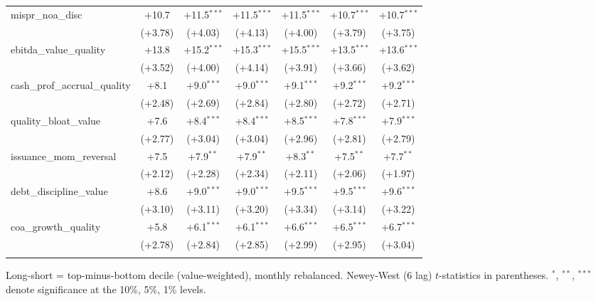 \begin{table}[htbp]
\begin{threeparttable}
\begin{tabular}{lcccccc}
\addlinespace
mispr\_noa\_disc & +10.7 & +11.5$^{***}$ & +11.5$^{***}$ & +11.5$^{***}$ & +10.7$^{***}$ & +10.7$^{***}$ \\
 & (+3.78) & (+4.03) & (+4.13) & (+4.00) & (+3.79) & (+3.75) \\
\addlinespace
ebitda\_value\_quality & +13.8 & +15.2$^{***}$ & +15.3$^{***}$ & +15.5$^{***}$ & +13.5$^{***}$ & +13.6$^{***}$ \\
 & (+3.52) & (+4.00) & (+4.14) & (+3.91) & (+3.66) & (+3.62) \\
\addlinespace
cash\_prof\_accrual\_quality & +8.1 & +9.0$^{***}$ & +9.0$^{***}$ & +9.1$^{***}$ & +9.2$^{***}$ & +9.2$^{***}$ \\
 & (+2.48) & (+2.69) & (+2.84) & (+2.80) & (+2.72) & (+2.71) \\
\addlinespace
quality\_bloat\_value & +7.6 & +8.4$^{***}$ & +8.4$^{***}$ & +8.5$^{***}$ & +7.8$^{***}$ & +7.9$^{***}$ \\
 & (+2.77) & (+3.04) & (+3.04) & (+2.96) & (+2.81) & (+2.79) \\
\addlinespace
issuance\_mom\_reversal & +7.5 & +7.9$^{**}$ & +7.9$^{**}$ & +8.3$^{**}$ & +7.5$^{**}$ & +7.7$^{**}$ \\
 & (+2.12) & (+2.28) & (+2.34) & (+2.11) & (+2.06) & (+1.97) \\
\addlinespace
debt\_discipline\_value & +8.6 & +9.0$^{***}$ & +9.0$^{***}$ & +9.5$^{***}$ & +9.5$^{***}$ & +9.6$^{***}$ \\
 & (+3.10) & (+3.11) & (+3.20) & (+3.34) & (+3.14) & (+3.22) \\
\addlinespace
coa\_growth\_quality & +5.8 & +6.1$^{***}$ & +6.1$^{***}$ & +6.6$^{***}$ & +6.5$^{***}$ & +6.7$^{***}$ \\
 & (+2.78) & (+2.84) & (+2.85) & (+2.99) & (+2.95) & (+3.04) \\
\addlinespace
\bottomrule
\end{tabular}
\begin{tablenotes}\footnotesize
\item Long-short = top-minus-bottom decile (value-weighted), monthly rebalanced. Newey-West (6 lag) $t$-statistics in parentheses. $^{*}$, $^{**}$, $^{***}$ denote significance at the 10\%, 5\%, 1\% levels.
\end{tablenotes}
\end{threeparttable}
\end{table}
